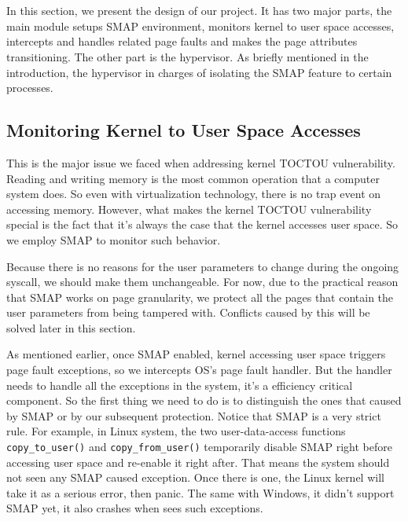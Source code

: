 
\section{\name}
\label{sec:design}

In this section, we present the design of our project. It has two major parts, the main module setups SMAP environment, monitors kernel to user space accesses, intercepts and handles related page faults and makes the page attributes transitioning. The other part is the hypervisor. As briefly mentioned in the introduction, the hypervisor in charges of isolating the SMAP feature to certain processes.

\subsection{Monitoring Kernel to User Space Accesses}

This is the major issue we faced when addressing kernel TOCTOU vulnerability. Reading and writing memory is the most common operation that a computer system does. So even with virtualization technology, there is no trap event on accessing memory. However, what makes the kernel TOCTOU vulnerability special is the fact that it's always the case that the kernel accesses user space. So we employ SMAP to monitor such behavior. 

Because there is no reasons for the user parameters to change during the ongoing syscall, we should make them unchangeable. For now, due to the practical reason that SMAP works on page granularity, we protect all the pages that contain the user parameters from being tampered with. Conflicts caused by this will be solved later in this section.

As mentioned earlier, once SMAP enabled, kernel accessing user space triggers page fault exceptions, so we intercepts OS's page fault handler. But the handler needs to handle all the exceptions in the system, it's a efficiency critical component. So the first thing we need to do is to distinguish the ones that caused by SMAP or by our subsequent protection. Notice that SMAP is a very strict rule. For example, in Linux system, the two user-data-access functions \texttt{copy\_to\_user()} and \texttt{copy\_from\_user()} temporarily disable SMAP right before accessing user space and re-enable it right after. That means the system should not seen any SMAP caused exception. Once there is one, the Linux kernel will take it as a serious error, then panic. The same with Windows, it didn't support SMAP yet, it also crashes when sees such exceptions.

